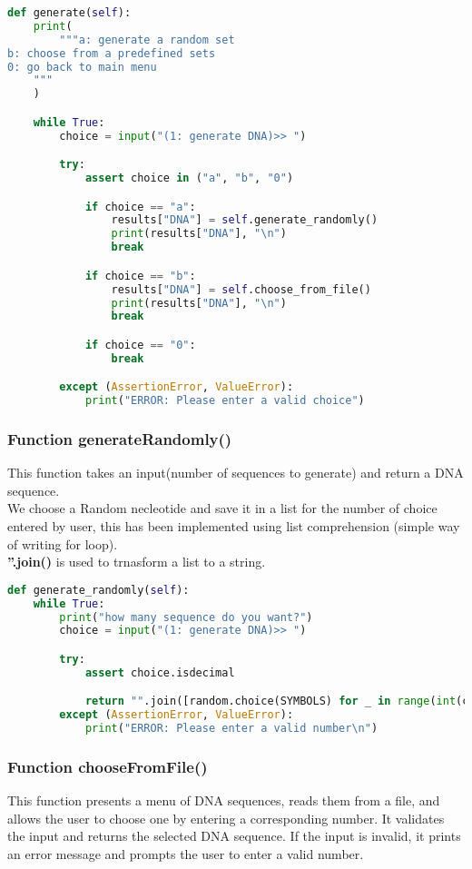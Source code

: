 \documentclass[11pt]{article}
\begin{document}
\begin{lstlisting}[language=Python, style=PythonStyle]
def generate(self):
    print(
        """a: generate a random set
b: choose from a predefined sets
0: go back to main menu
    """
    )

    while True:
        choice = input("(1: generate DNA)>> ")

        try:
            assert choice in ("a", "b", "0")

            if choice == "a":
                results["DNA"] = self.generate_randomly()
                print(results["DNA"], "\n")
                break

            if choice == "b":
                results["DNA"] = self.choose_from_file()
                print(results["DNA"], "\n")
                break

            if choice == "0":
                break

        except (AssertionError, ValueError):
            print("ERROR: Please enter a valid choice")
\end{lstlisting}

\subsubsection{Function generateRandomly()}
This function takes an input(number of sequences to generate) and return a DNA sequence.\\
We choose a Random necleotide and save it in a list for the number of choice entered by user, this has been implemented using list comprehension (simple way of writing for loop).\\
\textbf{''.join()} is used to trnasform a list to a string.
\begin{lstlisting}[language=Python, style=PythonStyle]
def generate_randomly(self):
    while True:
        print("how many sequence do you want?")
        choice = input("(1: generate DNA)>> ")

        try:
            assert choice.isdecimal

            return "".join([random.choice(SYMBOLS) for _ in range(int(choice))])
        except (AssertionError, ValueError):
            print("ERROR: Please enter a valid number\n")
\end{lstlisting}

\subsubsection{Function chooseFromFile()}
This function presents a menu of DNA sequences, reads them from a file, and allows the user to choose one by entering a corresponding number. It validates the input and returns the selected DNA sequence. If the input is invalid, it prints an error message and prompts the user to enter a valid number.
\end{document}
